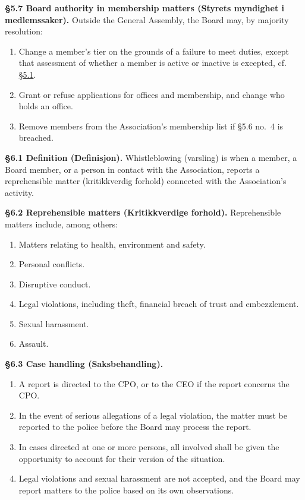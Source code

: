 \documentclass{../../../Common/Latex/Templates/rapport}
\begin{document}
\textbf{\S 5.7 Board authority in membership matters (Styrets myndighet i medlemssaker).}\label{bylaw:5.7} Outside the General Assembly, the Board may, by majority resolution:
\begin{enumerate}
  \item Change a member's tier on the grounds of a failure to meet duties, except that assessment of whether a member is active or inactive is excepted, cf. \hyperref[bylaw:5.1]{\S 5.1}.
  \item Grant or refuse applications for offices and membership, and change who holds an office.
  \item Remove members from the Association's membership list if \S5.6 no.\ 4 is breached.
\end{enumerate}

\label{bylaw:6}
\textbf{\S 6.1 Definition (Definisjon).}\label{bylaw:6.1} Whistleblowing (varsling) is when a member, a Board member, or a person in contact with the Association, reports a reprehensible matter (kritikkverdig forhold) connected with the Association's activity.

\textbf{\S 6.2 Reprehensible matters (Kritikkverdige forhold).}\label{bylaw:6.2} Reprehensible matters include, among others:
\begin{enumerate}
  \item Matters relating to health, environment and safety.
  \item Personal conflicts.
  \item Disruptive conduct.
  \item Legal violations, including theft, financial breach of trust and embezzlement.
  \item Sexual harassment.
  \item Assault.
\end{enumerate}

\textbf{\S 6.3 Case handling (Saksbehandling).}\label{bylaw:6.3}
\begin{enumerate}
  \item A report is directed to the CPO, or to the CEO if the report concerns the CPO.
  \item In the event of serious allegations of a legal violation, the matter must be reported to the police before the Board may process the report.
  \item In cases directed at one or more persons, all involved shall be given the opportunity to account for their version of the situation.
  \item Legal violations and sexual harassment are not accepted, and the Board may report matters to the police based on its own observations.
\end{enumerate}
\end{document}
